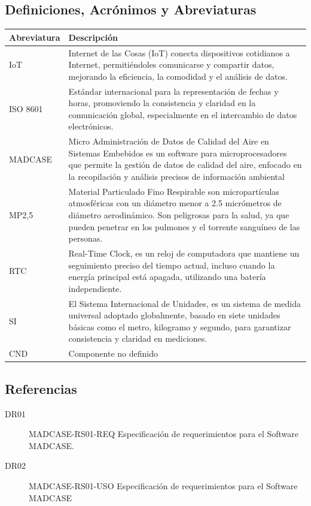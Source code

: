 \documentclass[
11pt, %
codirector, %
]{charter}
\begin{document}
\subsection{Definiciones, Acrónimos y Abreviaturas}
\begin{tabular}{lp{13cm}}
	\toprule
	\textbf{Abreviatura}	& \textbf{Descripción}  \\
	\midrule
	
	IoT & Internet de las Cosas (IoT) conecta dispositivos cotidianos a Internet, permitiéndoles comunicarse y compartir datos, mejorando la eficiencia, la comodidad y el análisis de datos. \\
	
	ISO 8601 & Estándar internacional para la representación de fechas y horas, promoviendo la consistencia y claridad en la comunicación global, especialmente en el intercambio de datos electrónicos. \\    
	
	MADCASE & Micro Administración de Datos de Calidad del Aire en Sistemas Embebidos es un software para microprocesadores que permite la gestión de datos de calidad del aire, enfocado en la recopilación y análisis precisos de información ambiental \\
	
	MP2,5 & Material Particulado Fino Respirable son micropartículas atmosféricas con un diámetro menor a 2.5 micrómetros de diámetro aerodinámico. Son peligrosas para la salud, ya que pueden penetrar en los pulmones y el torrente sanguíneo de las personas.\\
	
	RTC & Real-Time Clock, es un reloj de computadora que mantiene un seguimiento preciso del tiempo actual, incluso cuando la energía principal está apagada, utilizando una batería independiente. \\
	
	SI & El Sistema Internacional de Unidades, es un sistema de medida universal adoptado globalmente, basado en siete unidades básicas como el metro, kilogramo y segundo, para garantizar consistencia y claridad en mediciones. \\
	
	CND & Componente no definido \\ 
	\bottomrule
	
\end{tabular}



\subsection{Referencias}
\begin{description}
	\item [DR01] MADCASE-RS01-REQ Especificación de requerimientos para el Software MADCASE.
	
	\item [DR02] MADCASE-RS01-USO Especificación de requerimientos para el Software MADCASE

\end{description}
\end{document}
